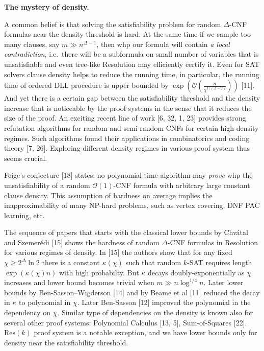 \par\medskip\noindent\textbf{The mystery of density.}\par




A common belief is that solving the satisfiability problem for random $\Delta$-CNF formulas
near the density threshold is hard. At the same time if we sample too many clauses, say
$m\gg n^{\Delta-1}$, then whp our formula will contain \emph{a local contradiction}, i.e. there will
be a subformula on small number of variables that is unsatisfiable and even tree-like Resolution
may efficiently certify it. Even for SAT solvers clause density helps to reduce the running time, in
particular, the running time of ordered $\mathrm{DLL}$ procedure is upper bounded by
$\exp\left(\mathcal{O}\left(\frac{n}{\chi^{1/(\Delta-2)}}\right)\right)$ [11]. And yet there is
a certain gap between the satisfiability threshold and the density increase that is noticeable by the
proof systems in the sense that it reduces the size of the proof. An exciting recent line of work
[6, 32, 1, 23] provides strong refutation algorithms for
random and semi-random CNFs for certain
high-density regimes. Such algorithms found their applications in combinatorics and coding theory
[7, 26]. Exploring different density regimes in various proof system thus seems
crucial.\par




Feige’s conjecture [18] states: no polynomial time algorithm may \emph{prove} whp the
unsatisfiability of a random $\mathcal{O}\left(1\right)$-CNF formula with arbitrary large constant clause density. This
assumption of hardness on average implies the inapproximability of many NP-hard problems, such as vertex
covering, DNF PAC learning, etc.\par




The sequence of papers that starts with the classical lower bounds by Chvátal and Szemerédi
[15] shows the hardness of random $\Delta$-CNF formulas in Resolution for various regimes of
density. In [15] the authors show that for any fixed $\chi\geq 2^{\Delta}\ln 2$ there is a
constant $\kappa(\chi)$ such that random $k$-SAT requires length $\exp(\kappa(\chi)n)$ with high
probabilty. But $\kappa$ decays doubly-exponentially as $\chi$ increases and lower bound becomes trivial
when $m\gg n\log^{1/4}n$. Later lower bounds by Ben-Sasson–Wigderson [14] and by Beame et al
[11] reduced the decay in $\kappa$ to polynomial in $\chi$. Later Ben-Sasson [12]
improved the polynomial in the dependency on $\chi$. Similar type of dependencies on the density is known
also for several other proof systems: Polynomial Calculus [13, 5], Sum-of-Squares
[22]. $\mathrm{Res}(k)$ proof system is a notable exception, and we have lower bounds only for
density near the satisfiability threshold.\par




